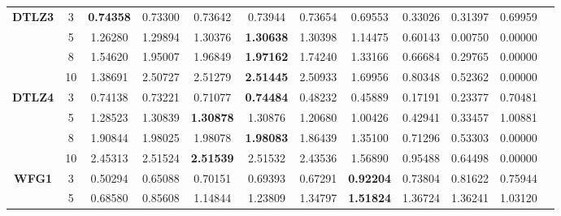 \documentclass{sig-alternate}
\begin{document}
\begin{table}[!htb]
\begin{tabular}{|c|c|c|c|c|c|c|c|c|c|c|c|}
		\multirow{4}{*}{\textbf{DTLZ3}} & 3          & \textbf{0.74358} & 0.73300           & 0.73642               & 0.73944          & 0.73654             & 0.69553             & 0.33026            & 0.31397              & 0.69959          \\ \cline{2-11} 
		& 5          & 1.26280          & 1.29894           & 1.30376               & \textbf{1.30638} & 1.30398             & 1.14475             & 0.60143            & 0.00750              & 0.00000          \\ \cline{2-11} 
		& 8          & 1.54620          & 1.95007           & 1.96849               & \textbf{1.97162} & 1.74240             & 1.33166             & 0.66684            & 0.29765              & 0.00000          \\ \cline{2-11} 
		& 10         & 1.38691          & 2.50727           & 2.51279               & \textbf{2.51445} & 2.50933             & 1.69956             & 0.80348            & 0.52362              & 0.00000          \\ \hline
		\multirow{4}{*}{\textbf{DTLZ4}} & 3          & 0.74138          & 0.73221           & 0.71077               & \textbf{0.74484} & 0.48232             & 0.45889             & 0.17191            & 0.23377              & 0.70481          \\ \cline{2-11} 
		& 5          & 1.28523          & 1.30839           & \textbf{1.30878}      & 1.30876          & 1.20680             & 1.00426             & 0.42941            & 0.33457              & 1.00881          \\ \cline{2-11} 
		& 8          & 1.90844          & 1.98025           & 1.98078               & \textbf{1.98083} & 1.86439             & 1.35100             & 0.71296            & 0.53303              & 0.00000          \\ \cline{2-11} 
		& 10         & 2.45313          & 2.51524           & \textbf{2.51539}      & 2.51532          & 2.43536             & 1.56890             & 0.95488            & 0.64498              & 0.00000          \\ \hline
		\multirow{4}{*}{\textbf{WFG1}}  & 3          & 0.50294          & 0.65088           & 0.70151               & 0.69393          & 0.67291             & \textbf{0.92204}    & 0.73804            & 0.81622              & 0.75944          \\ \cline{2-11} 
		& 5          & 0.68580          & 0.85608           & 1.14844               & 1.23809          & 1.34797             & \textbf{1.51824}    & 1.36724            & 1.36241              & 1.03120          \\ \cline{2-11} 

\end{tabular}
\end{table}
\end{document}
